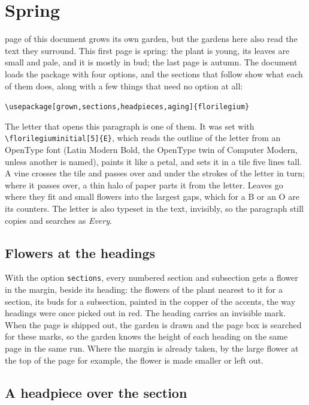 \documentclass[11pt,a4paper]{article}
\newcommand\code[1]{\texttt{\small #1}}
\begin{document}
\section{Spring}

 page of this document grows its own garden, but the
gardens here also read the text they surround. This first page is spring: the plant is
young, its leaves are small and pale, and it is mostly in bud; the last page is autumn.
The document loads the package with four options, and the sections that follow show what
each of them does, along with a few things that need no option at all:
\begin{center}\code{\textbackslash usepackage[grown,sections,headpieces,aging]\{florilegium\}}\end{center}

The letter that opens this paragraph is one of them. It was set with
\code{\textbackslash florilegiuminitial[5]\{E\}}, which reads the outline of the letter from an OpenType font (Latin
Modern Bold, the OpenType twin of Computer Modern, unless another is named), paints it
like a petal, and sets it in a tile five lines tall. A vine crosses the tile and passes
over and under the strokes of the letter in turn; where it passes over, a thin halo of
paper parts it from the letter. Leaves go where they fit and small flowers into the
largest gaps, which for a B or an O are its counters. The letter is also typeset in the
text, invisibly, so the paragraph still copies and searches as \emph{Every}.

\subsection{Flowers at the headings}

With the option \code{sections}, every numbered section and subsection gets a flower in the
margin, beside its heading: the flowers of the plant nearest to it for a section, its buds
for a subsection, painted in the copper of the accents, the way headings were once picked
out in red. The heading carries an invisible mark. When the page is shipped out, the
garden is drawn and the page box is searched for these marks, so the garden knows the
height of each heading on the same page in the same run. Where the margin is already
taken, by the large flower at the top of the page for example, the flower is made
smaller or left out.

\subsection{A headpiece over the section}
\end{document}
